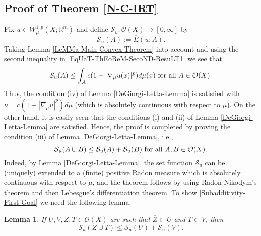 \documentclass[10pt]{amsart}
\numberwithin{equation}{section}
\newtheorem{lemma}[theorem]{Lemma}
\theoremstyle{definition}
\theoremstyle{remark}
\begin{document}
\subsection{Proof of Theorem \ref{N-C-IRT}} Fix $u\in W^{1,p}_\mu(X;{{\mathbb R}}^m)$ and define $\mathcal{S}_u:\mathcal{O}(X)\to[0,\infty]$ by 
$$
\mathcal{S}_u(A):=\overline{E}(u;A).
$$ 
Taking Lemma \ref{LeMMa-Main-Convex-Theorem} into account and using the second inequality in \eqref{EqUaT-ThEoReM-SecoND-ResuLT1} we see that 
\begin{equation}\label{ImPorTanT-EqUAtION}
\mathcal{S}_u(A)\leq\int_A c(1+|\nabla_\mu u(x)|^p)d\mu(x)\hbox{ for all }A\in\mathcal{O}(X).
\end{equation}
Thus, the condition (iv) of Lemma \ref{DeGiorgi-Letta-Lemma} is satisfied with $\nu=c(1+|\nabla_\mu u|^p)d\mu$ (which is absolutely continuous with respect to $\mu$). On the other hand, it is easily seen that the conditions (i) and (ii) of Lemma \ref{DeGiorgi-Letta-Lemma} are satisfied. Hence, the proof is completed by proving  the condition (iii) of Lemma \ref{DeGiorgi-Letta-Lemma}, i.e., 
\begin{equation}\label{Subadditivity-First-Goal}
\mathcal{S}_u(A\cup B)\leq \mathcal{S}_u(A)+\mathcal{S}_u(B)\hbox{ for all }A,B\in\mathcal{O}(X). 
\end{equation}
Indeed, by Lemma \ref{DeGiorgi-Letta-Lemma}, the set function $\mathcal{S}_u$ can be (uniquely) extended to a (finite) positive Radon measure which is absolutely continuous with respect to $\mu$, and the theorem follows by using Radon-Nikodym's theorem and then Lebesgue's differentiation theorem. To show \eqref{Subadditivity-First-Goal} we need the following lemma.
\begin{lemma}\label{LeMMa-MaiN-TheOReM1}
If $U,V,Z,T\in\mathcal{O}(X)$ are such that $\overline{Z}\subset U$ and $T\subset V$,  then
\begin{equation}\label{SubAddiTive-Goal}
\mathcal{S}_u(Z\cup T)\leq\mathcal{S}_u(U)+\mathcal{S}_u(V).
\end{equation}
\end{lemma}
\end{document}
